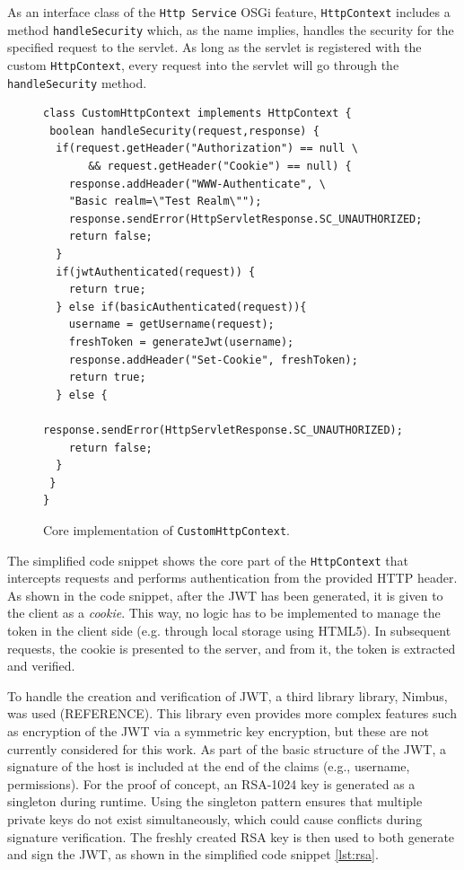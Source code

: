 \documentclass[12pt]{article}
\newcommand{\TODO}{\todo[inline]}
\begin{document}
As an interface class of the \texttt{Http Service} OSGi feature, \texttt{HttpContext} includes a method \texttt{handleSecurity} which, as the name implies, handles the security for the specified request to the servlet. As long as the servlet is registered with the custom \texttt{HttpContext}, every request into the servlet will go through the \texttt{handleSecurity} method.

\TODO{FIX HYPHEN ISSUES AND REF TO CODE SNIPPET INSTEAD OF FIG}
\begin{figure} [htb]
  \begin{lstlisting}
class CustomHttpContext implements HttpContext {   
 boolean handleSecurity(request,response) {
  if(request.getHeader("Authorization") == null \
       && request.getHeader("Cookie") == null) {
    response.addHeader("WWW-Authenticate", \
	"Basic realm=\"Test Realm\"");
    response.sendError(HttpServletResponse.SC_UNAUTHORIZED;
    return false;
  }	    
  if(jwtAuthenticated(request)) {
    return true;		
  } else if(basicAuthenticated(request)){
    username = getUsername(request);
    freshToken = generateJwt(username);
    response.addHeader("Set-Cookie", freshToken);
    return true;
  } else {
    response.sendError(HttpServletResponse.SC_UNAUTHORIZED);
    return false;
  }
 }
}
\end{lstlisting}
\caption{Core implementation of \texttt{CustomHttpContext}.}
\label{lst:core_impl}
\end{figure}

The simplified code snippet shows the core part of the \texttt{HttpContext} that intercepts requests and performs authentication from the provided HTTP header. As shown in the code snippet, after the JWT has been generated, it is given to the client as a \emph{cookie}. This way, no logic has to be implemented to manage the token in the client side (e.g. through local storage using HTML5). In subsequent requests, the cookie is presented to the server, and from it, the token is extracted and verified.

To handle the creation and verification of JWT, a third library library, Nimbus, was used (REFERENCE). This library even provides more complex features such as encryption of the JWT via a symmetric key encryption, but these are not currently considered for this work. As part of the basic structure of the JWT, a signature of the host is included at the end of the claims (e.g., username, permissions). For the proof of concept, an RSA-1024 key is generated as a singleton during runtime. Using the singleton pattern ensures that multiple private keys do not exist simultaneously, which could cause conflicts during signature verification. The freshly created RSA key is then used to both generate and sign the JWT, as shown in the simplified code snippet \ref{lst:rsa}.
\end{document}
